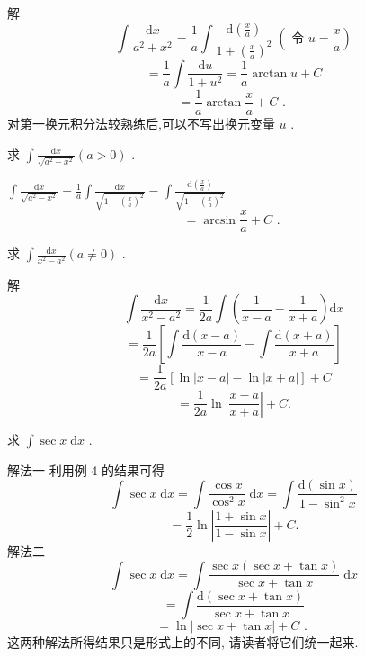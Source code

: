 解
\[
\int \frac{\mathrm{d}x}{{a}^{2} + {x}^{2}} = \frac{1}{a}\int \frac{\mathrm{d}\left( \frac{x}{a}\right) }{1 + {\left( \frac{x}{a}\right) }^{2}}\;\left( {\text{ 令 }u = \frac{x}{a}}\right)
\]
\[
= \frac{1}{a}\int \frac{\mathrm{d}u}{1 + {u}^{2}} = \frac{1}{a}\arctan u + C
\]
\[
= \frac{1}{a}\arctan \frac{x}{a} + C\text{ . }
\]
对第一换元积分法较熟练后,可以不写出换元变量 \(u\) .

\begin{example}

\end{example}
求 \(\int \frac{\mathrm{d}x}{\sqrt{{a}^{2} - {x}^{2}}}\left( {a > 0}\right)\) .

\begin{solution}

\end{solution}
\(\int \frac{\mathrm{d}x}{\sqrt{{a}^{2} - {x}^{2}}} = \frac{1}{a}\int \frac{\mathrm{d}x}{\sqrt{1 - {\left( \frac{x}{a}\right) }^{2}}} = \int \frac{\mathrm{d}\left( \frac{x}{a}\right) }{\sqrt{1 - {\left( \frac{x}{a}\right) }^{2}}}\)
\[
= \arcsin \frac{x}{a} + C\text{ . }
\]
\begin{example}

\end{example}
求 \(\int \frac{\mathrm{d}x}{{x}^{2} - {a}^{2}}\left( {a \neq  0}\right)\) .

解
\[
\int \frac{\mathrm{d}x}{{x}^{2} - {a}^{2}} = \frac{1}{2a}\int \left( {\frac{1}{x - a} - \frac{1}{x + a}}\right) \mathrm{d}x
\]
\[
= \frac{1}{2a}\left\lbrack  {\int \frac{\mathrm{d}\left( {x - a}\right) }{x - a}-\int \frac{\mathrm{d}\left( {x + a}\right) }{x + a}}\right\rbrack
\]
\[
= \frac{1}{2a}\left\lbrack  {\ln \left| {x - a}\right|  - \ln \left| {x + a}\right| }\right\rbrack   + C
\]
\[
= \frac{1}{2a}\ln \left| \frac{x - a}{x + a}\right|  + C.
\]
\begin{example}

\end{example}
求 \(\int \sec x\mathrm{\;d}x\) .

\begin{solution}

\end{solution}
解法一 利用例 4 的结果可得
\[
\int \sec x\mathrm{\;d}x = \int \frac{\cos x}{{\cos }^{2}x}\mathrm{\;d}x = \int \frac{\mathrm{d}\left( {\sin x}\right) }{1 - {\sin }^{2}x}
\]
\[
= \frac{1}{2}\ln \left| \frac{1 + \sin x}{1 - \sin x}\right|  + C.
\]
解法二
\[
\int \sec x\mathrm{\;d}x = \int \frac{\sec x\left( {\sec x + \tan x}\right) }{\sec x + \tan x}\mathrm{\;d}x
\]
\[
= \int \frac{\mathrm{d}\left( {\sec x + \tan x}\right) }{\sec x + \tan x}
\]
\[
= \ln \left| {\sec x + \tan x}\right|  + C\text{ . }
\]
这两种解法所得结果只是形式上的不同, 请读者将它们统一起来.

